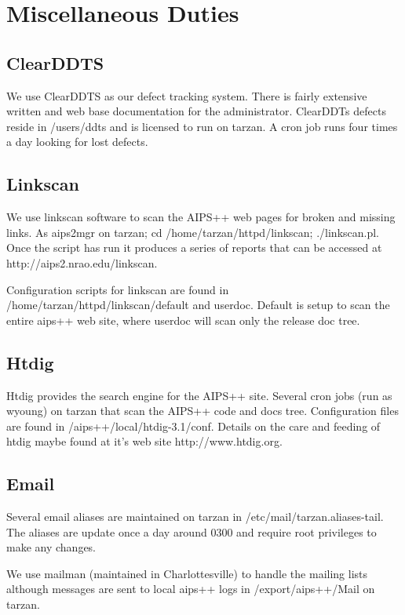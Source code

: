 \chapter{Miscellaneous Duties}
\section{ClearDDTS}
We use ClearDDTS as our defect tracking system.  There is fairly extensive
written and web base documentation for the administrator.  ClearDDTs defects
reside in /users/ddts and is licensed to run on tarzan. A cron job runs four
times a day looking for lost defects.
\section{Linkscan}
We use linkscan software to scan the AIPS++ web pages for broken and missing
links.  As aips2mgr on tarzan; cd /home/tarzan/httpd/linkscan; ./linkscan.pl.
Once the script has run it produces a series of reports that can be accessed
at http://aips2.nrao.edu/linkscan.

Configuration scripts for linkscan are found in
/home/tarzan/httpd/linkscan/default and userdoc.  Default is setup to scan the
entire aips++ web site, where userdoc will scan only the release doc tree.
\section{Htdig}
Htdig provides the search engine for the AIPS++ site.  Several cron jobs 
(run as wyoung) 
on tarzan that scan the AIPS++ code and docs tree.  Configuration files are found
in /aips++/local/htdig-3.1/conf.  Details on the care and feeding of htdig maybe
found at it's web site http://www.htdig.org.

\section{Email}
Several email aliases are maintained on tarzan in /etc/mail/tarzan.aliases-tail.
The aliases are update once a day around 0300 and require root privileges to 
make any changes.

We use mailman 
(maintained in Charlottesville) to handle the mailing lists although messages are
sent to local aips++ logs in /export/aips++/Mail on tarzan.
